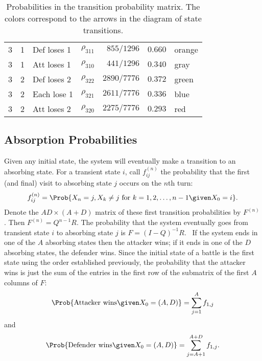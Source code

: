 \documentclass[12pt]{article}
\begin{document}
\begin{table}
\begin{tabular}{cclcrrl}
        \hline
        3      & 1        & Def loses 1 & $\rho_{311}$ & $855/1296$  & $0.660$ & orange     \\ %
         
        3      & 1        & Att loses 1 & $\rho_{310}$ & $441/1296$  & $0.340$ & gray       \\ %
         
        \hline
        3      & 2        & Def loses 2 & $\rho_{322}$ & $2890/7776$ & $0.372$ & green      \\ %
         
        3      & 2        & Each lose 1 & $\rho_{321}$ & $2611/7776$ & $0.336$ & blue       \\ 
        3      & 2        & Att loses 2 & $\rho_{320}$ & $2275/7776$ & $0.293$ & red        \\ %
         
    \end{tabular}
    \caption{Probabilities in the transition probability matrix.  The
    colors correspond to the arrows in the diagram of state transitions.}
    \label{tab:riskgame:risktransprobs}
\end{table}

\subsection*{Absorption Probabilities}

Given any initial state, the system will eventually make a transition to
an absorbing state.  For a transient state \( i \), call \( f_{ij}^{(n)}
\) the probability that the first (and final) visit to absorbing state \(
j \) occurs on the \( n \)th turn:
\[
    f_{ij}^{(n)} = \Prob{X_n = j, X_k \ne j \text{ for } k=1,2,\dots,
    n-1 \given X_0 = i}.
\] Denote the \( AD \times (A + D) \) matrix of these first transition
probabilities by \( F^{(n)} \).  Then \( F^{(n)} = Q^{n-1}R \).  The
probability that the system eventually goes from transient state \( i \)
to absorbing state \( j \) is \( F = (I - Q)^{-1} R \).~%
If the system ends in one of the \( A \) absorbing states then the
attacker wins; if it ends in one of the \( D \) absorbing states, the
defender wins.  Since the initial state of a battle is the first state
using the order established previously, the probability that the
attacker wins is just the sum of the entries in the first row of the
submatrix of the first \( A \) columns of \( F \):
\[
    \Prob{\text{Attacker wins} \given X_0 = (A,D)} = \sum\limits_{j=1}^{A}
    f_{1, j}
\] and
\[
    \Prob{\text{Defender wins} \given X_0 = (A,D)} = \sum\limits_{j=A+1}^
    {A+D} f_{1, j}.
\]
\end{document}
